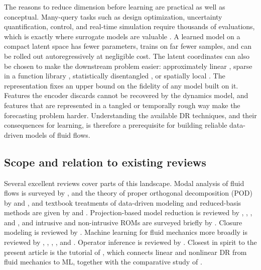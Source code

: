 The reasons to reduce dimension before learning are practical as well as
conceptual. Many-query tasks such as design optimization, uncertainty
quantification, control, and real-time simulation require thousands of
evaluations, which is exactly where surrogate models are valuable
\parencite{benner2015survey}. A learned model on a compact latent space has
fewer parameters, trains on far fewer samples, and can be rolled out
autoregressively at negligible cost. The latent coordinates can also be chosen
to make the downstream problem easier: approximately linear
\parencite{lusch2018koopman}, sparse in a function library
\parencite{champion2019sindyae}, statistically disentangled
\parencite{eivazi2022betavae,solera2024betavae}, or spatially local
\parencite{deshmukh2020dls,morton2026scitech}. The representation fixes an
upper bound on the fidelity of any model built on it. Features the encoder
discards cannot be recovered by the dynamics model, and features that are
represented in a tangled or temporally rough way make the forecasting problem
harder. Understanding the available DR techniques, and their consequences for
learning, is therefore a prerequisite for building reliable data-driven models
of fluid flows.

\subsection{Scope and relation to existing reviews}

Several excellent reviews cover parts of this landscape. Modal analysis of
fluid flows is surveyed by \textcite{taira2017modal,taira2020modal}, and the
theory of proper orthogonal decomposition (POD) by \textcite{berkooz1993} and
\textcite{holmes2012turbulence}, and textbook treatments of data-driven
modeling and reduced-basis methods are given by \textcite{brunton2019data} and
\textcite{hesthaven2016certified}. Projection-based model reduction is reviewed by
\textcite{benner2015survey}, \textcite{rowley2017arfm},
\textcite{lassila2014mor}, and \textcite{hesthaven2022acta}, and intrusive and
non-intrusive ROMs are surveyed briefly by \textcite{padula2024brief}. Closure modeling
is reviewed by \textcite{ahmed2021closures}. Machine learning for fluid
mechanics more broadly is reviewed by \textcite{brunton2020ml},
\textcite{duraisamy2019turbulence}, \textcite{vinuesa2022enhancing},
\textcite{vinuesa2024perspectives}, and \textcite{brunton2024promising}.
Operator inference is reviewed by \textcite{kramer2024opinf}. Closest in
spirit to the present article is the tutorial of \textcite{mendez2023linear},
which connects linear and nonlinear DR from fluid mechanics to ML, together
with the comparative study of \textcite{csala2022comparing}.

